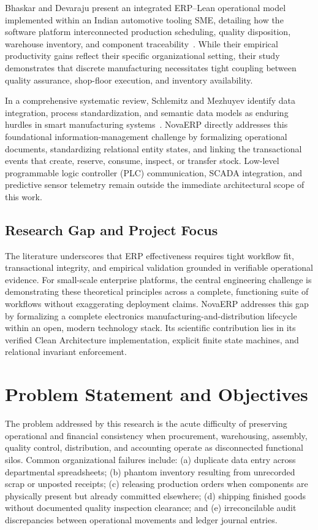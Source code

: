 \documentclass[conference]{IEEEtran}
\begin{document}
Bhaskar and Devaraju present an integrated ERP--Lean operational model implemented within an Indian automotive tooling SME, detailing how the software platform interconnected production scheduling, quality disposition, warehouse inventory, and component traceability~\cite{b2}. While their empirical productivity gains reflect their specific organizational setting, their study demonstrates that discrete manufacturing necessitates tight coupling between quality assurance, shop-floor execution, and inventory availability.

In a comprehensive systematic review, Schlemitz and Mezhuyev identify data integration, process standardization, and semantic data models as enduring hurdles in smart manufacturing systems~\cite{b4}. NovaERP directly addresses this foundational information-management challenge by formalizing operational documents, standardizing relational entity states, and linking the transactional events that create, reserve, consume, inspect, or transfer stock. Low-level programmable logic controller (PLC) communication, SCADA integration, and predictive sensor telemetry remain outside the immediate architectural scope of this work.

\subsection{Research Gap and Project Focus}
The literature underscores that ERP effectiveness requires tight workflow fit, transactional integrity, and empirical validation grounded in verifiable operational evidence. For small-scale enterprise platforms, the central engineering challenge is demonstrating these theoretical principles across a complete, functioning suite of workflows without exaggerating deployment claims. NovaERP addresses this gap by formalizing a complete electronics manufacturing-and-distribution lifecycle within an open, modern technology stack. Its scientific contribution lies in its verified Clean Architecture implementation, explicit finite state machines, and relational invariant enforcement.

\section{Problem Statement and Objectives}
The problem addressed by this research is the acute difficulty of preserving operational and financial consistency when procurement, warehousing, assembly, quality control, distribution, and accounting operate as disconnected functional silos. Common organizational failures include: (a) duplicate data entry across departmental spreadsheets; (b) phantom inventory resulting from unrecorded scrap or unposted receipts; (c) releasing production orders when components are physically present but already committed elsewhere; (d) shipping finished goods without documented quality inspection clearance; and (e) irreconcilable audit discrepancies between operational movements and ledger journal entries.
\end{document}
